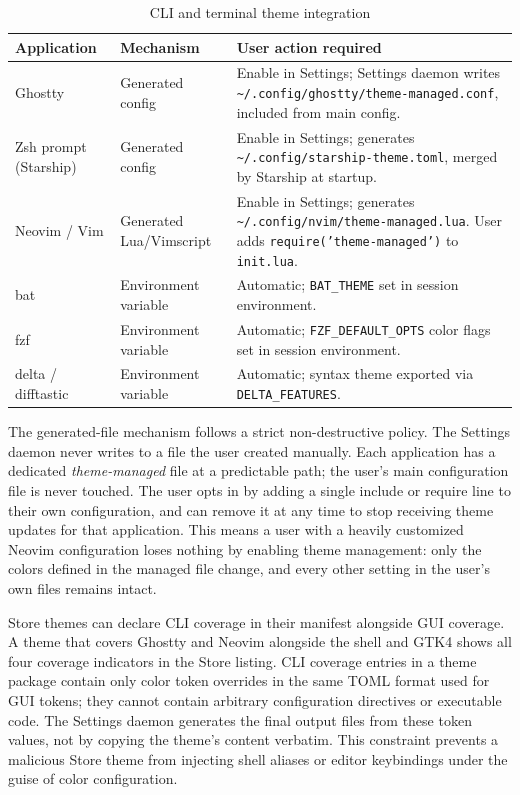 \begin{table}[htbp]
\caption{CLI and terminal theme integration}
\label{tab:cli-theming}
\begin{tabularx}{\linewidth}{llX}
\toprule
\textbf{Application} & \textbf{Mechanism} & \textbf{User action required} \\
\midrule
Ghostty &
  Generated config &
  Enable in Settings; Settings daemon writes
  \texttt{\textasciitilde/.config/ghostty/theme-managed.conf},
  included from main config. \\
Zsh prompt (Starship) &
  Generated config &
  Enable in Settings; generates
  \texttt{\textasciitilde/.config/starship-theme.toml},
  merged by Starship at startup. \\
Neovim / Vim &
  Generated Lua/Vimscript &
  Enable in Settings; generates
  \texttt{\textasciitilde/.config/nvim/theme-managed.lua}.
  User adds \texttt{require('theme-managed')} to \texttt{init.lua}. \\
bat &
  Environment variable &
  Automatic; \texttt{BAT\_THEME} set in session environment. \\
fzf &
  Environment variable &
  Automatic; \texttt{FZF\_DEFAULT\_OPTS} color flags set in session
  environment. \\
delta / difftastic &
  Environment variable &
  Automatic; syntax theme exported via \texttt{DELTA\_FEATURES}. \\
\bottomrule
\end{tabularx}
\end{table}

The generated-file mechanism follows a strict non-destructive policy. The
Settings daemon never writes to a file the user created manually. Each
application has a dedicated \emph{theme-managed} file at a predictable path;
the user's main configuration file is never touched. The user opts in by
adding a single include or require line to their own configuration, and can
remove it at any time to stop receiving theme updates for that application.
This means a user with a heavily customized Neovim configuration loses nothing
by enabling theme management: only the colors defined in the managed file
change, and every other setting in the user's own files remains intact.

Store themes can declare CLI coverage in their manifest alongside GUI coverage.
A theme that covers Ghostty and Neovim alongside the shell and GTK4 shows all
four coverage indicators in the Store listing. CLI coverage entries in a theme
package contain only color token overrides in the same TOML format used for
GUI tokens; they cannot contain arbitrary configuration directives or
executable code. The Settings daemon generates the final output files from
these token values, not by copying the theme's content verbatim. This
constraint prevents a malicious Store theme from injecting shell aliases or
editor keybindings under the guise of color configuration.

